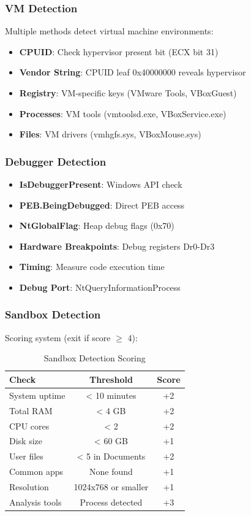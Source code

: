 \documentclass[12pt,a4paper]{article}
\begin{document}
\subsubsection{VM Detection}

Multiple methods detect virtual machine environments:

\begin{itemize}
    \item \textbf{CPUID}: Check hypervisor present bit (ECX bit 31)
    \item \textbf{Vendor String}: CPUID leaf 0x40000000 reveals hypervisor
    \item \textbf{Registry}: VM-specific keys (VMware Tools, VBoxGuest)
    \item \textbf{Processes}: VM tools (vmtoolsd.exe, VBoxService.exe)
    \item \textbf{Files}: VM drivers (vmhgfs.sys, VBoxMouse.sys)
\end{itemize}

\subsubsection{Debugger Detection}

\begin{itemize}
    \item \textbf{IsDebuggerPresent}: Windows API check
    \item \textbf{PEB.BeingDebugged}: Direct PEB access
    \item \textbf{NtGlobalFlag}: Heap debug flags (0x70)
    \item \textbf{Hardware Breakpoints}: Debug registers Dr0-Dr3
    \item \textbf{Timing}: Measure code execution time
    \item \textbf{Debug Port}: NtQueryInformationProcess
\end{itemize}

\subsubsection{Sandbox Detection}

Scoring system (exit if score $\geq$ 4):

\begin{table}[H]
\centering
\begin{tabular}{lcc}
\toprule
\textbf{Check} & \textbf{Threshold} & \textbf{Score} \\
\midrule
System uptime & < 10 minutes & +2 \\
Total RAM & < 4 GB & +2 \\
CPU cores & < 2 & +2 \\
Disk size & < 60 GB & +1 \\
User files & < 5 in Documents & +2 \\
Common apps & None found & +1 \\
Resolution & 1024x768 or smaller & +1 \\
Analysis tools & Process detected & +3 \\
\bottomrule
\end{tabular}
\caption{Sandbox Detection Scoring}
\end{table}
\end{document}
